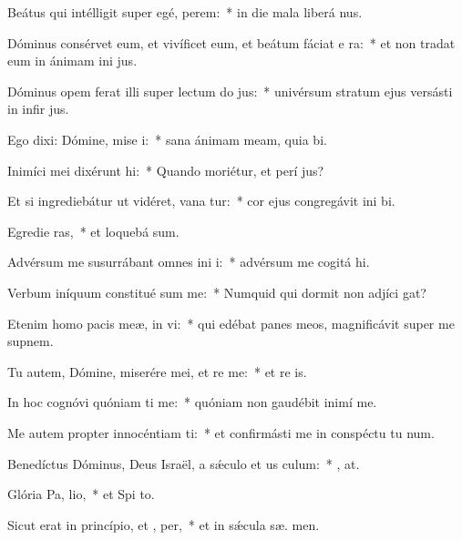 \item Beátus qui intélligit super egé,  perem:~* in die mala liberá  nus.
\item Dóminus consérvet eum, et vivíficet eum, et beátum fáciat e  ra:~* et non tradat eum in ánimam ini jus.
\item Dóminus opem ferat illi super lectum do jus:~* univérsum stratum ejus versásti in infir jus.
\item Ego dixi: Dómine, mise i:~* sana ánimam meam, quia  bi.
\item Inimíci mei dixérunt  hi:~* Quando moriétur, et perí  jus?
\item Et si ingrediebátur ut vidéret, vana tur:~* cor ejus congregávit ini bi.
\item Egredie ras,~* et loquebá  sum.
\item Advérsum me susurrábant omnes ini i:~* advérsum me cogitá  hi.
\item Verbum iníquum constitué sum me:~* Numquid qui dormit non adjíci  gat?
\item Etenim homo pacis meæ, in  vi:~* qui edébat panes meos, magnificávit super me supnem.
\item Tu autem, Dómine, miserére mei, et re me:~* et re is.
\item In hoc cognóvi quóniam ti me:~* quóniam non gaudébit inimí   me.
\item Me autem propter innocéntiam ti:~* et confirmásti me in conspéctu tu  num.
\item Benedíctus Dóminus, Deus Israël, a sǽculo et us  culum:~* , at.
\item Glória Pa,  lio,~* et Spi to.
\item Sicut erat in princípio, et ,  per,~* et in sǽcula sæ. men.

